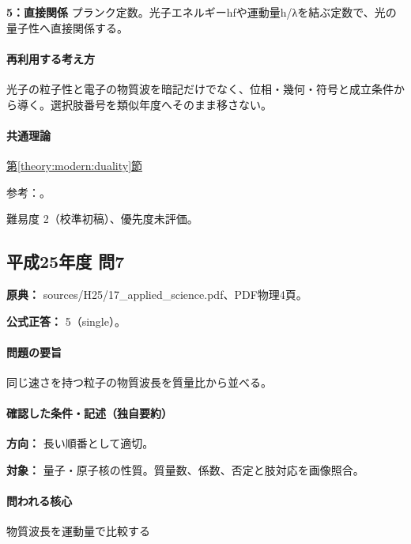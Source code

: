 \noindent\textbf{5：直接関係} プランク定数。光子エネルギーhfや運動量h/λを結ぶ定数で、光の量子性へ直接関係する。\par

\paragraph{再利用する考え方} 光子の粒子性と電子の物質波を暗記だけでなく、位相・幾何・符号と成立条件から導く。選択肢番号を類似年度へそのまま移さない。

\paragraph{共通理論} \hyperref[theory:modern:duality]{第\ref*{theory:modern:duality}節}

\par 参考：\cite{os_photoelectric,os_matter}。

\par 難易度 2（校準初稿）、優先度未評価。

\subsection{平成25年度 問7}
\label{q:h25-reg-applied-07}

\noindent\textbf{原典：} sources/H25/17\_applied\_science.pdf、PDF物理4頁。

\textbf{公式正答：} 5（single）。

\paragraph{問題の要旨} 同じ速さを持つ粒子の物質波長を質量比から並べる。

\paragraph{確認した条件・記述（独自要約）}\mbox{}\par

\noindent\textbf{方向：} 長い順番として適切。\par

\noindent\textbf{対象：} 量子・原子核の性質。質量数、係数、否定と肢対応を画像照合。\par

\paragraph{問われる核心} 物質波長を運動量で比較する

